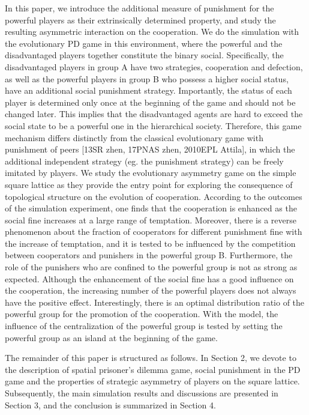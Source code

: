 \documentclass[%
 aip,
 amsmath,amssymb,
 reprint,%
]{revtex4-1}
\begin{document}
In this paper, we introduce the additional measure of punishment for the powerful players as their extrinsically determined property, and study the resulting asymmetric interaction on the cooperation. We do the simulation with the evolutionary PD game in this environment, where the powerful and the disadvantaged players together constitute the binary social. Specifically, the disadvantaged players in group A have two strategies, cooperation and defection, as well as the powerful players in group B who possess a higher social status, have an additional social punishment strategy. Importantly, the status of each player is determined only once at the beginning of the game and should not be changed later. This implies that the disadvantaged agents are hard to exceed the social state to be a powerful one in the hierarchical society. Therefore, this game mechanism differs distinctly from the classical evolutionary game with punishment of peers [13SR zhen, 17PNAS zhen, 2010EPL Attila], in which the additional independent strategy (eg. the punishment strategy) can be freely imitated by players. We study the evolutionary asymmetry game on the simple square lattice as they provide the entry point for exploring the consequence of topological structure on the evolution of cooperation. According to the outcomes of the simulation experiment, one finds that the cooperation is enhanced as the social fine increases at a large range of temptation. Moreover, there is a reverse phenomenon about the fraction of cooperators for different punishment fine with the increase of temptation, and it is tested to be influenced by the competition between cooperators and punishers in the powerful group B. Furthermore, the role of the punishers who are confined to the powerful group is not as strong as expected. Although the enhancement of the social fine has a good influence on the cooperation, the increasing number of the powerful players does not always have the positive effect. Interestingly, there is an optimal distribution ratio of the powerful group for the promotion of the cooperation. With the model, the influence of the centralization of the powerful group is tested by setting the powerful group as an island at the beginning of the game.

The remainder of this paper is structured as follows. In Section 2, we devote to the description of spatial prisoner's dilemma game, social punishment in the PD game and the properties of strategic asymmetry of players on the square lattice. Subsequently, the main simulation results and discussions are presented in Section 3, and the conclusion is summarized in Section 4.
\end{document}
